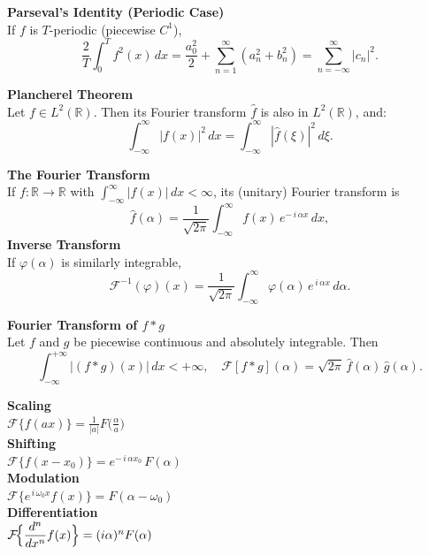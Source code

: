 \documentclass[8pt]{article}
\begin{document}
\begin{multicols}{2}
\noindent \textbf{Parseval's Identity (Periodic Case)}\\
If $f$ is $T$-periodic (piecewise $C^1$),
\[
  \frac{2}{T}\int_{0}^{T} f^{2}(x)\,dx
  = \frac{a_{0}^{2}}{2} + \sum_{n=1}^{\infty}(a_{n}^{2}+b_{n}^{2})
  = \sum_{n=-\infty}^{\infty}\!\!\bigl|c_{n}\bigr|^{2}.
\]

\noindent \textbf{Plancherel Theorem}\\
Let $f \in L^2(\mathbb{R})$. Then its Fourier transform $\hat{f}$ is also in $L^2(\mathbb{R})$, and:
\[
  \int_{-\infty}^\infty |f(x)|^2 \, dx
  = \int_{-\infty}^\infty |\hat{f}(\xi)|^2 \, d\xi.
\]

\noindent \textbf{The Fourier Transform}\\
If $f:\mathbb{R}\to\mathbb{R}$ with $\int_{-\infty}^{\infty}\!|f(x)|\,dx<\infty$, its (unitary) Fourier transform is
\[
  \widehat{f}(\alpha)=\frac{1}{\sqrt{2\pi}}
  \int_{-\infty}^{\infty} f(x)\, e^{-\,i\,\alpha x}\,dx,
\]
\noindent \textbf{Inverse Transform}\\
If $\varphi(\alpha)$ is similarly integrable,
\[
  \mathcal{F}^{-1}(\varphi)(x)= \frac{1}{\sqrt{2\pi}}
  \int_{-\infty}^{\infty}\!\varphi(\alpha)\,e^{\,i\,\alpha x}\,d\alpha.
\]

\noindent \textbf{Fourier Transform of \(f * g\)}\\
Let \(f\) and \(g\) be piecewise continuous and absolutely integrable. Then
\[
  \int_{-\infty}^{+\infty} |(f * g)(x)|\,dx < +\infty,\quad
  \mathcal{F}[f * g](\alpha)
  = \sqrt{2\pi} \,\hat{f}(\alpha)\,\hat{g}(\alpha).
\]
\vspace*{-15px}
\setlength{\columnsep}{-35pt} %
\begin{multicols}{2}
    \small
    \textbf{Scaling} \\
    $\mathcal{F}\{f(ax)\} = \frac{1}{|a|} F\!\bigl(\tfrac{\alpha}{a}\bigr)$\\
    \textbf{Shifting} \\
    $\mathcal{F}\{f(x - x_0)\} = e^{-\,i\,\alpha x_0}\,F(\alpha)$\\
    \textbf{Modulation} \\
    $\mathcal{F}\{e^{\,i\,\omega_0 x} f(x)\} = F(\alpha - \omega_0)$\\
    \textbf{Differentiation} \\
    $\mathcal{F}\!\Bigl\{\dfrac{d^n}{dx^n}f(x)\Bigr\}
        = (i \alpha)^n F(\alpha)$\\


    \columnbreak


\end{multicols}
\end{multicols}
\end{document}
